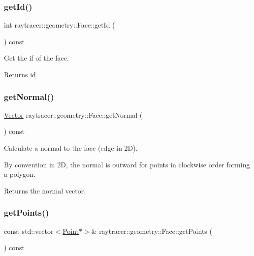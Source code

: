 \subsubsection{\texorpdfstring{get\+Id()}{getId()}}
{\footnotesize\ttfamily int raytracer\+::geometry\+::\+Face\+::get\+Id (\begin{DoxyParamCaption}{ }\end{DoxyParamCaption}) const}



Get the if of the face. 

\begin{DoxyReturn}{Returns}
id 
\end{DoxyReturn}
\mbox{\label{classraytracer_1_1geometry_1_1Face_aac805c7505f21f9f6bf65c78cdd344de}} 
\subsubsection{\texorpdfstring{get\+Normal()}{getNormal()}}
{\footnotesize\ttfamily \hyperlink{classraytracer_1_1geometry_1_1Vector}{Vector} raytracer\+::geometry\+::\+Face\+::get\+Normal (\begin{DoxyParamCaption}{ }\end{DoxyParamCaption}) const}



Calculate a normal to the face (edge in 2D). 

By convention in 2D, the normal is outward for points in clockwise order forming a polygon. \begin{DoxyReturn}{Returns}
the normal vector. 
\end{DoxyReturn}
\mbox{\label{classraytracer_1_1geometry_1_1Face_a4cd62fdb7f63bc1acee5fd9a7de233e1}} 
\subsubsection{\texorpdfstring{get\+Points()}{getPoints()}}
{\footnotesize\ttfamily const std\+::vector$<$\hyperlink{classraytracer_1_1geometry_1_1Point}{Point}$\ast$$>$\& raytracer\+::geometry\+::\+Face\+::get\+Points (\begin{DoxyParamCaption}{ }\end{DoxyParamCaption}) const}




